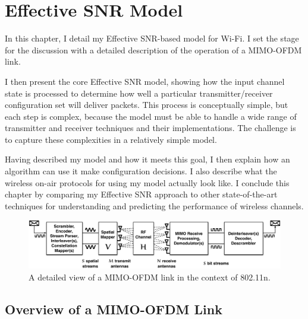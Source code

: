 \ifx\mainfile\undefined

\setcounter{chapter}{3} %
\fi

\cleardoublepage
\chapter{Effective SNR Model}
\label{chap:model}

In this chapter, I detail my Effective SNR-based model for Wi-Fi. I set the stage for the discussion with a detailed description of the operation of a MIMO-OFDM link.

I then present the core Effective SNR model, showing how the input channel state is processed to determine how well a particular transmitter/receiver configuration set will deliver packets. %
This process is conceptually simple, but each step is complex, because the model must be able to handle a wide range of transmitter and receiver techniques and their implementations. The challenge is to capture these complexities in a relatively simple model.

Having described my model and how it meets this goal, I then explain how an algorithm can use it make configuration decisions. I also describe what the wireless on-air protocols for using my model actually look like. I conclude this chapter by comparing my Effective SNR approach to other state-of-the-art techniques for understanding and predicting the performance of wireless channels.

\begin{figure}[b]
\centering
\includegraphics[width=\textwidth]{figures/model/11n_link_simplified_bigger_fonts.pdf}
\caption[An 802.11n link]{\label{fig:11n_link_simplified}A detailed view of a MIMO-OFDM link in the context of 802.11n.}
\end{figure}

\section{Overview of a MIMO-OFDM Link}
\label{sec:11n_overview}

